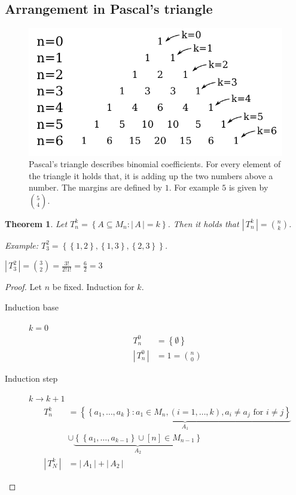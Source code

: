 \documentclass[a4paper,landscape,twocolumn]{article}
\newtheorem{theorem}{Theorem}
\newcommand\set[1]{\left\{#1\right\}}
\newcommand\card[1]{\left|\,#1\,\right|}
\begin{document}
\subsection{Arrangement in Pascal's triangle}
\begin{figure}[!h]
  \begin{center}
    \includegraphics{img/pascals_triangle.pdf}
    \caption{
      Pascal's triangle describes binomial coefficients.
      For every element of the triangle it holds that,
      it is adding up the two numbers above a number.
      The margins are defined by $1$. For example $5$ is given by ${5 \choose 4}$.
    }
  \end{center}
\end{figure}

\begin{theorem}
  Let $T_n^k = \set{A \subseteq M_n: \card{A} = k}$.
  Then it holds that $\card{T_n^k} = \binom nk$.

  Example: $T_3^2 = \set{\set{1, 2}, \set{1, 3}, \set{2, 3}}$.

  $\card{T_3^2} = \binom 32 = \frac{3!}{2! 1!} = \frac 62 = 3$
\end{theorem}

\begin{proof}
  Let $n$ be fixed. Induction for $k$.
  \begin{description}
    \item[Induction base] $k=0$
      \begin{align*}
        T_n^0        &= \set{\emptyset} \\
        \card{T_n^0} &= 1 = \binom n0
      \end{align*}
    \item[Induction step] $k\rightarrow k+1$
      \begin{align*}
        T_n^k &= \underbrace{\set{\set{a_1, \ldots, a_k}: a_1 \in M_n, (i = 1, \ldots, k), a_i \neq a_j \text{ for } i \neq j}}_{A_1} \\
              &\cup \underbrace{\set{\set{a_1, \ldots, a_{k-1}} \cup [n] \in M_{n-1}}}_{A_2} \\
        \card{T_N^k} &= \card{A_1} + \card{A_2}
      \end{align*}
  \end{description}
\end{proof}
\end{document}
